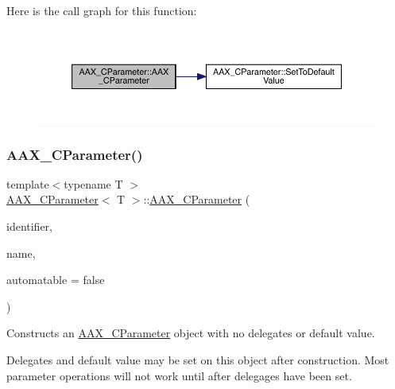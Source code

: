 Here is the call graph for this function\+:
\nopagebreak
\begin{figure}[H]
\begin{center}
\leavevmode
\includegraphics[width=350pt]{a01537_af91631db027f09bc8918082c842d1719_cgraph}
\end{center}
\end{figure}
\mbox{\label{a01537_a3cba283b1eb665a511b400981aecf5e5}} 
\subsubsection{\texorpdfstring{AAX\_CParameter()}{AAX\_CParameter()}\hspace{0.1cm}{\footnotesize\ttfamily [4/4]}}
{\footnotesize\ttfamily template$<$typename T $>$ \\
\mbox{\hyperlink{a01537}{A\+A\+X\+\_\+\+C\+Parameter}}$<$ T $>$\+::\mbox{\hyperlink{a01537}{A\+A\+X\+\_\+\+C\+Parameter}} (\begin{DoxyParamCaption}\item[{const \mbox{\hyperlink{a01873}{A\+A\+X\+\_\+\+I\+String}} \&}]{identifier,  }\item[{const \mbox{\hyperlink{a01873}{A\+A\+X\+\_\+\+I\+String}} \&}]{name,  }\item[{bool}]{automatable = {\ttfamily false} }\end{DoxyParamCaption})}



Constructs an \mbox{\hyperlink{a01537}{A\+A\+X\+\_\+\+C\+Parameter}} object with no delegates or default value. 

Delegates and default value may be set on this object after construction. Most parameter operations will not work until after delegages have been set.



